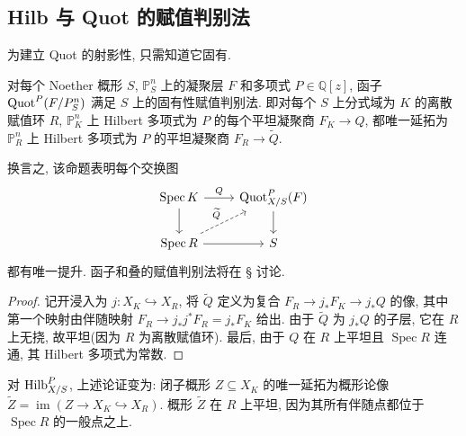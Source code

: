 \subsection{Hilb 与 Quot 的赋值判别法}\label{src:2.4.2-subsection}
为建立 Quot 的射影性, 只需知道它固有.
\begin{proposition}\label{src:2.4.2}
对每个 Noether 概形 $S$, $\mathbb P_S^n$ 上的凝聚层 $F$ 和多项式 $P\in\mathbb Q[z]$, 函子 $\operatorname{Quot}^P(F/P_S^n)$ 满足 $S$ 上的固有性赋值判别法.
即对每个 $S$ 上分式域为 $K$ 的离散赋值环 $R$, $\mathbb P_K^n$ 上 Hilbert 多项式为 $P$ 的每个平坦凝聚商 $F_K\to Q$, 都唯一延拓为 $\mathbb P_R^n$ 上 Hilbert 多项式为 $P$ 的平坦凝聚商 $F_R\to\widetilde Q$.
\end{proposition}
\begin{remark}\label{src:2.4.3}
换言之, 该命题表明每个交换图
\[
\begin{tikzcd}
\operatorname{Spec}K\arrow[r,"Q"]\arrow[d]&
\Quot^P_{X/S}(F)\arrow[d]\\
\operatorname{Spec}R\arrow[r]\arrow[ur,dashed,"\widetilde Q"]&S
\end{tikzcd}
\]
都有唯一提升. 函子和叠的赋值判别法将在 \S{} 讨论.
\end{remark}
\begin{proof}
记开浸入为 $j:X_K\hookrightarrow X_R$, 将 $\widetilde Q$ 定义为复合
$F_R\to j_*F_K\to j_*Q$ 的像, 其中第一个映射由伴随映射
$F_R\to j_*j^*F_R=j_*F_K$ 给出.
由于 $\widetilde Q$ 为 $j_*Q$ 的子层, 它在 $R$ 上无挠, 故平坦(因为 $R$ 为离散赋值环).
最后, 由于 $Q$ 在 $R$ 上平坦且 $\operatorname{Spec}R$ 连通, 其 Hilbert 多项式为常数.
\end{proof}
\begin{remark}\label{src:2.4.4}
对 $\operatorname{Hilb}^P_{X/S}$, 上述论证变为: 闭子概形 $Z\subseteq X_K$ 的唯一延拓为概形论像
$\widetilde Z=\operatorname{im}(Z\to X_K\hookrightarrow X_R)$.
概形 $\widetilde Z$ 在 $R$ 上平坦, 因为其所有伴随点都位于 $\operatorname{Spec}R$ 的一般点之上.
\end{remark}
